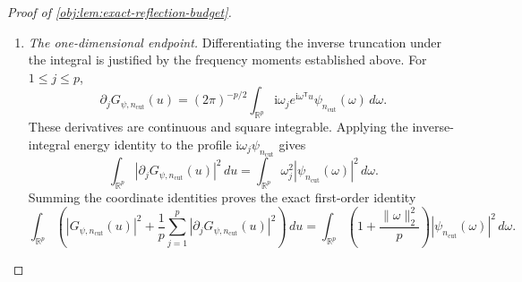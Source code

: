 \begin{proof}[Proof of \cref{obj:lem:exact-reflection-budget}]
\begin{enumerate}
To identify their limit explicitly, let \(\mathcal F_{\mathrm{cyc},p}\) denote the unitary \(L^2\) extension of
\[
(\mathcal F_{\mathrm{cyc},p}\psi)(\eta)
=
\int_{\mathbb R^p}\psi(\omega)
e^{-2\pi\mathrm i\eta^{\mathsf T}\omega}\,d\omega,
\qquad \psi\in L^1\cap L^2,\quad \eta\in\mathbb R^p,
\]
and define, as an \(L^2\) class,
\[
(\mathcal I_p\psi)(u)
=
(2\pi)^{-p/2}
(\mathcal F_{\mathrm{cyc},p}\psi)\!\left(-\frac{u}{2\pi}\right).
\]
The squared prefactor \((2\pi)^{-p}\) cancels the dilation Jacobian \((2\pi)^p\). Thus
\[
\|\mathcal I_p\psi\|_2^2=\|\psi\|_2^2,
\qquad
\|\mathcal I_p\psi-\mathcal I_p\chi\|_2^2=\|\psi-\chi\|_2^2,
\qquad \psi,\chi\in L^2(\mathbb R^p;\mathbb C).
\]
The defining integral identifies
\(G_{\psi,n_{\mathrm{cut}}}=\mathcal I_p\psi_{n_{\mathrm{cut}}}\) almost everywhere, whence
\[
\|G_{\psi,n_{\mathrm{cut}}}-\mathcal I_p\psi\|_2^2
=
\|\psi_{n_{\mathrm{cut}}}-\psi\|_2^2
\longrightarrow0.
\]

For an admissible extension \(G\in L^1\cap L^2\), its original spatial class is recovered by this construction. Fubini, applied to the integrable product of the truncated profile and an \(L^1\cap L^2\) test function \(\varphi\), gives
\[
\int_{\mathbb R^p}\overline{\varphi(u)}
G_{\psi,n_{\mathrm{cut}}}(u)\,du
=
\int_{\mathbb R^p}
\overline{(\mathcal F_p\varphi)(\omega)}
\psi_{n_{\mathrm{cut}}}(\omega)\,d\omega.
\]
Taking \(\psi=\mathcal F_pG\) and \(\varphi=G\), and expanding the squared distance using this pairing and the two Plancherel identities, yields
\[
\|G-G_{\mathcal F_pG,n_{\mathrm{cut}}}\|_2^2
=
\|\mathcal F_pG-(\mathcal F_pG)_{n_{\mathrm{cut}}}\|_2^2
\longrightarrow0.
\]
Uniqueness of the \(L^2\) limit therefore gives
\[
\mathcal I_p(\mathcal F_pG)=G
\quad\text{almost everywhere}.
\]

\item \textit{The one-dimensional endpoint.}
Differentiating the inverse truncation under the integral is justified by the frequency moments established above. For \(1\leq j\leq p\),
\[
\partial_jG_{\psi,n_{\mathrm{cut}}}(u)
=
(2\pi)^{-p/2}
\int_{\mathbb R^p}
\mathrm i\omega_j e^{\mathrm i\omega^{\mathsf T}u}
\psi_{n_{\mathrm{cut}}}(\omega)\,d\omega.
\]
These derivatives are continuous and square integrable. Applying the inverse-integral energy identity to the profile
\(\mathrm i\omega_j\psi_{n_{\mathrm{cut}}}\) gives
\[
\int_{\mathbb R^p}
|\partial_jG_{\psi,n_{\mathrm{cut}}}(u)|^2\,du
=
\int_{\mathbb R^p}
\omega_j^2|\psi_{n_{\mathrm{cut}}}(\omega)|^2\,d\omega.
\]
Summing the coordinate identities proves the exact first-order identity
\[
\int_{\mathbb R^p}
\left(
|G_{\psi,n_{\mathrm{cut}}}(u)|^2+
\frac1p\sum_{j=1}^p
|\partial_jG_{\psi,n_{\mathrm{cut}}}(u)|^2
\right)\,du
=
\int_{\mathbb R^p}
\left(1+\frac{\|\omega\|_2^2}{p}\right)
|\psi_{n_{\mathrm{cut}}}(\omega)|^2\,d\omega.
\]


\end{enumerate}
\end{proof}
